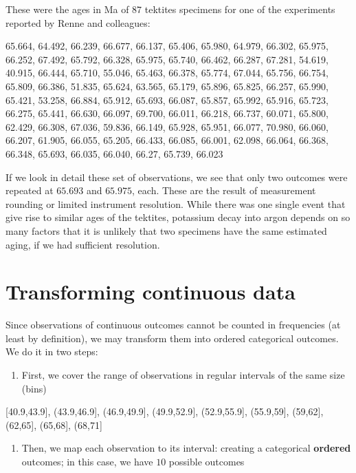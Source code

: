 \documentclass[
]{book}
\providecommand{\tightlist}{%
  \setlength{\itemsep}{0pt}\setlength{\parskip}{0pt}}
\begin{document}
These were the ages in Ma of \(87\) tektites specimens for one of the experiments reported by Renne and colleagues:

65.664, 64.492, 66.239, 66.677, 66.137, 65.406, 65.980, 64.979, 66.302, 65.975, 66.252, 67.492, 65.792, 66.328, 65.975, 65.740, 66.462, 66.287, 67.281, 54.619, 40.915, 66.444, 65.710, 55.046, 65.463, 66.378, 65.774, 67.044, 65.756, 66.754, 65.809, 66.386, 51.835, 65.624, 63.565, 65.179, 65.896, 65.825, 66.257, 65.990, 65.421, 53.258, 66.884, 65.912, 65.693, 66.087, 65.857, 65.992, 65.916, 65.723, 66.275, 65.441, 66.630, 66.097, 69.700, 66.011, 66.218, 66.737, 60.071, 65.800, 62.429, 66.308, 67.036, 59.836, 66.149, 65.928, 65.951, 66.077, 70.980, 66.060, 66.207, 61.905, 66.055, 65.205, 66.433, 66.085, 66.001, 62.098, 66.064, 66.368, 66.348, 65.693, 66.035, 66.040, 66.27, 65.739, 66.023

If we look in detail these set of observations, we see that only two outcomes were repeated at \(65.693\) and \(65.975\), each. These are the result of measurement rounding or limited instrument resolution. While there was one single event that give rise to similar ages of the tektites, potassium decay into argon depends on so many factors that it is unlikely that two specimens have the same estimated aging, if we had sufficient resolution.

\hypertarget{transforming-continuous-data}{%
\section{Transforming continuous data}\label{transforming-continuous-data}}

Since observations of continuous outcomes cannot be counted in frequencies (at least by definition), we may transform them into ordered categorical outcomes. We do it in two steps:

\begin{enumerate}
\def\labelenumi{\arabic{enumi})}
\tightlist
\item
  First, we cover the range of observations in regular intervals of the same size (bins)
\end{enumerate}

{[}40.9,43.9{]}, (43.9,46.9{]}, (46.9,49.9{]}, (49.9,52.9{]}, (52.9,55.9{]}, (55.9,59{]}, (59,62{]}, (62,65{]}, (65,68{]}, (68,71{]}

\begin{enumerate}
\def\labelenumi{\arabic{enumi})}
\setcounter{enumi}{1}
\tightlist
\item
  Then, we map each observation to its interval: creating a categorical \textbf{ordered} outcomes; in this case, we have \(10\) possible outcomes
\end{enumerate}
\end{document}
